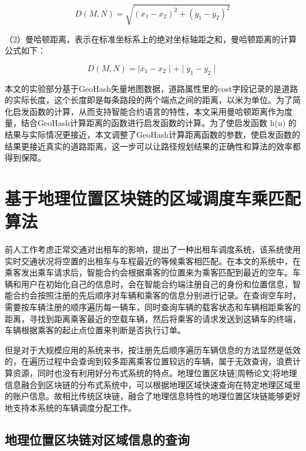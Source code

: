 \begin{equation}
  \label{eqn:Euclid}
  D(M, N)=\sqrt{(x_1-x_2)^{2}+(y_1-y_2)^{2}}
\end{equation}

（2）曼哈顿距离，表示在标准坐标系上的绝对坐标轴距之和，曼哈顿距离的计算公式如下：\par
\begin{equation}
  \label{eqn:manhattan}
  D(M, N)=\mid x_1-x_2 \mid+\mid y_1-y_2 \mid
\end{equation}


本文的实验部分基于GeoHash矢量地图数据，道路属性里的cost字段记录的是道路的实际长度，这个长度即是每条路段的两个端点之间的距离，以米为单位。为了简化启发函数的计算，从而支持智能合约语言的特性，本文采用曼哈顿距离作为度量，结合GeoHash计算距离的函数进行启发函数的计算。为了使启发函数 h(n) 的结果与实际情况更接近，本文调整了GeoHash计算距离函数的参数，使启发函数的结果更接近真实的道路距离，这一步可以让路径规划结果的正确性和算法的效率都得到保障。\par


\section{基于地理位置区块链的区域调度车乘匹配算法}

前人工作考虑正常交通对出租车的影响，提出了一种出租车调度系统，该系统使用实时交通状况将空置的出租车与车程最近的等候乘客相匹配。在本文的系统中，在乘客发出乘车请求后，智能合约会根据乘客的位置来为乘客匹配到最近的空车。车辆和用户在初始化自己的信息时，会在智能合约端注册自己的身份和位置信息，智能合约会按照注册的先后顺序对车辆和乘客的信息分别进行记录。在查询空车时，需要按车辆注册的顺序遍历每一辆车，同时查询车辆的载客状态和车辆相距乘客的距离，寻找到距离乘客最近的空载车辆，然后将乘客的请求发送到这辆车的终端，车辆根据乘客的起止点位置来判断是否执行订单。\par

但是对于大规模应用的系统来书，按注册先后顺序遍历车辆信息的方法显然是低效的，在遍历过程中会查询到较多距离乘客位置较远的车辆，属于无效查询，浪费计算资源，同时也没有利用好分布式系统的特点。地理位置区块链[周畅论文]将地理信息融合到区块链的分布式系统中，可以根据地理区域快速查询在特定地理区域里的账户信息。故相比传统区块链，融合了地理信息特性的地理位置区块链能够更好地支持本系统的车辆调度分配工作。\par

\subsection{地理位置区块链对区域信息的查询}
